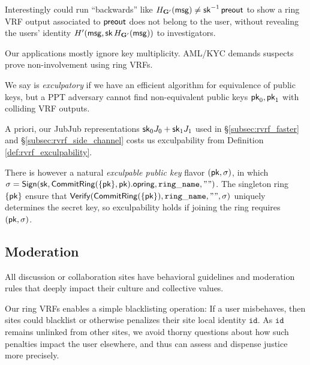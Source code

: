 Interestingly \PedVRF could run ``backwards'' like
 $H_{{\mathbf{G}}'}(\mathsf{msg}) \ne \mathsf{sk}^{-1} \, {\mathsf{preout}}$
to show a ring VRF output associated to ${\mathsf{preout}}$
does not belong to the user, without revealing the users'
identity $H'(\mathsf{msg}, \mathsf{sk} \, H_{{\mathbf{G}}'}(\mathsf{msg}))$ to investigators. 

Our applications mostly ignore key multiplicity. 
AML/KYC demands suspects prove non-involvement using ring VRFs.

\begin{definition}\label{def:rvrf_exculpability}
We say \rVRF is {\em exculpatory} if we have an efficient algorithm
for equivalence of public keys, but a PPT adversary \adv cannot
find non-equivalent public keys $\mathsf{pk}_0,\mathsf{pk}_1$ with colliding VRF outputs.
\end{definition}

A priori, our JubJub representations $\mathsf{sk}_0 J_0 + \mathsf{sk}_1 J_1$
used in \S\ref{subsec:rvrf_faster} and \S\ref{subsec:rvrf_side_channel}
costs us exculpability from Definition \ref{def:rvrf_exculpability}.

There is however a natural {\em exculpable public key} flavor $(\mathsf{pk},\sigma)$,
in which
 $\sigma = {\mathsf{Sign}}(\mathsf{sk}, {\mathsf{CommitRing}}(\{ \mathsf{pk} \},\mathsf{pk}).\mathsf{opring}, \mathtt{ring\_name}, \mathtt{""})$.
The singleton ring $\{ \mathsf{pk} \}$ ensure that 
${\mathsf{Verify}}({\mathsf{CommitRing}}(\{\mathsf{pk}\}), \mathtt{ring\_name}, \mathtt{""}, \sigma)$
uniquely determines the secret key, so exculpability holds
 if joining the ring requires $(\mathsf{pk},\sigma)$.



\subsection{Moderation}
\label{subsec:moderation}

All discussion or collaboration sites have behavioral guidelines and
moderation rules that deeply impact their culture and collective values.

Our ring VRFs enables a simple blacklisting operation:
If a user misbehaves, then sites could blacklist or otherwise penalizes
their site local identity $\mathtt{id}$.
As $\mathtt{id}$ remains unlinked from other sites, we avoid thorny
questions about how such penalties impact the user elsewhere, and thus
can assess and dispense justice more precisely. 

